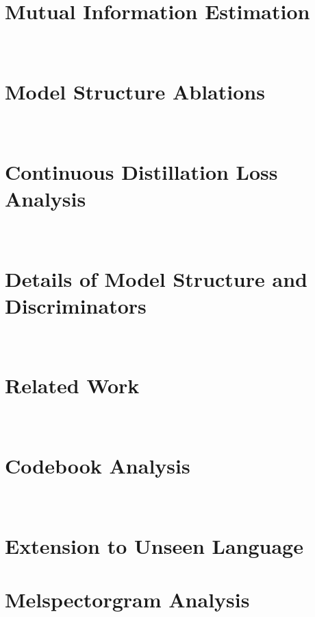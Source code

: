 \onecolumn\section{Mutual Information Estimation}~
\label{sec:app:mi_estimation}


\onecolumn\section{Model Structure Ablations}~
\label{sec:app:lstm_ablation}


\onecolumn\section{Continuous Distillation Loss Analysis}~
\label{sec:app:distll_loss}



\onecolumn\section{Details of Model Structure and Discriminators}~
\label{sec:app:model}



\onecolumn\section{Related Work}~
\label{sec:app:related}



\onecolumn\section{Codebook Analysis}~
\label{sec:app:codebook}



\onecolumn\section{Extension to Unseen Language}
\label{sec:unseen_language}


\onecolumn\section{Melspectorgram Analysis}~
\label{sec:app:mel}





